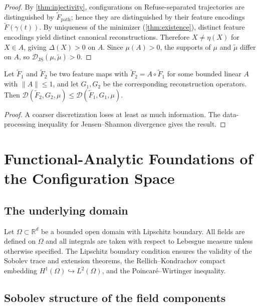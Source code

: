 \documentclass[12pt, oneside]{memoir}
\newcommand{\Ft}{\widetilde{F}}
\newcommand{\Fpath}{\widetilde{F}_{\mathrm{path}}}
\newcommand{\Djs}{\mathcal{D}_{\mathrm{JS}}}
\newcommand{\nnorm}[1]{\lVert #1 \rVert}
\begin{document}
\begin{proof}
By \cref{thm:injectivity}, configurations on Refuse-separated trajectories are
distinguished by $\Fpath$; hence they are distinguished by their feature encodings
$\Ft(\gamma(t))$.  By uniqueness of the minimizer (\cref{thm:existence}), distinct
feature encodings yield distinct canonical reconstructions.  Therefore $X \ne \eta(X)$
for $X \in A$, giving $\Delta(X) > 0$ on $A$.  Since $\mu(A) > 0$, the supports of
$\mu$ and $\tilde\mu$ differ on $A$, so $\Djs(\mu, \tilde\mu) > 0$.
\end{proof}

\begin{proposition}
\label{prop:monotone}
Let $\Ft_1$ and $\Ft_2$ be two feature maps with $\Ft_2 = A \circ \Ft_1$ for some
bounded linear $A$ with $\nnorm{A} \le 1$, and let $G_1, G_2$ be the corresponding
reconstruction operators.  Then
$\mathcal{D}(\Ft_2, G_2, \mu) \le \mathcal{D}(\Ft_1, G_1, \mu)$.
\end{proposition}

\begin{proof}
A coarser discretization loses at least as much information.  The data-processing
inequality for Jensen--Shannon divergence \cite{lin1991} gives the result.
\end{proof}

\chapter{Functional-Analytic Foundations of the Configuration Space}
\label{ch:fa-foundations}

\section{The underlying domain}

Let $\Omega \subset \mathbb{R}^d$ be a bounded open domain with Lipschitz boundary.
All fields are defined on $\Omega$ and all integrals are taken with respect to Lebesgue
measure unless otherwise specified.  The Lipschitz boundary condition ensures the
validity of the Sobolev trace and extension theorems, the Rellich--Kondrachov compact
embedding $H^1(\Omega) \hookrightarrow L^2(\Omega)$, and the Poincaré--Wirtinger
inequality.

\section{Sobolev structure of the field components}
\end{document}
